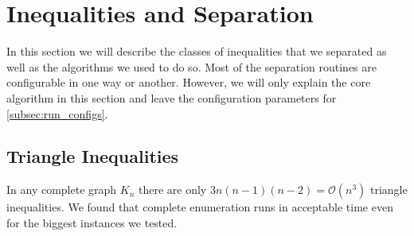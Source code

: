 \section{Inequalities and Separation}\label{sec:separation}
In this section we will describe the classes of inequalities that we separated as well as the algorithms we used to do so.
Most of the separation routines are configurable in one way or another.
However, we will only explain the core algorithm in this section and leave the configuration parameters for \cref{subsec:run_configs}.

\subsection{Triangle Inequalities}\label{subsec:triangle_separator}
In any complete graph $K_{n}$ there are only $3n(n-1)(n-2) = \mathcal{O}(n^{3})$ triangle inequalities.
We found that complete enumeration runs in acceptable time even for the biggest instances we tested.

